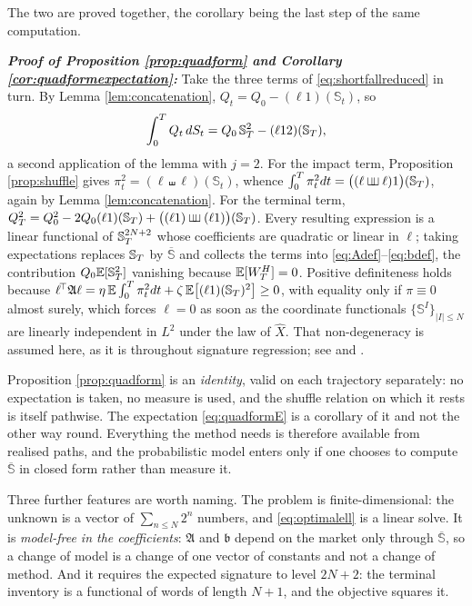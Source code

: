The two are proved together, the corollary being the last step of the same computation.

\textbf{\textit{Proof of Proposition \ref{prop:quadform} and Corollary \ref{cor:quadformexpectation}:}}
Take the three terms of \eqref{eq:shortfallreduced} in turn. By Lemma
\ref{lem:concatenation}, $Q_t=Q_0-(\ell 1)(\mathbb{S}_t)$, so
\[
  \int_0^{T}Q_t\,dS_t = Q_0\,\mathbb{S}^{2}_T-(\ell 12)(\mathbb{S}_T),
\]
a second application of the lemma with $j=2$. For the impact term, Proposition \ref{prop:shuffle}
gives $\pi_t^{2}=(\ell\shuffle\ell)(\mathbb{S}_t)$, whence
$\int_0^{T}\pi_t^{2}d t=\bigl((\ell\mathbin{\sqcup\mkern-6.5mu\sqcup}\ell)1\bigr)(\mathbb{S}_T)$, again by Lemma
\ref{lem:concatenation}. For the terminal term,
$Q_T^{2}=Q_0^{2}-2Q_0(\ell1)(\mathbb{S}_T)+\bigl((\ell1)\mathbin{\sqcup\mkern-6.5mu\sqcup}(\ell1)\bigr)(\mathbb{S}_T)$. Every
resulting expression is a linear functional of $\mathbb{S}^{2N+2}_T$ whose coefficients are quadratic or
linear in $\ell$; taking expectations replaces $\mathbb{S}_T$ by $\overline{\mathbb{S}}$ and collects the terms
into \eqref{eq:Adef}--\eqref{eq:bdef}, the contribution $Q_0\mathbb{E}[\mathbb{S}^{2}_T]$ vanishing because
$\mathbb{E}[W^{H}_T]=0$. Positive definiteness holds because
$\ell^{\!\top} \mathfrak{A}\ell=\eta\,\mathbb{E}\int_0^{T}\pi_t^{2}d t+\zeta\,\mathbb{E}\bigl[(\ell1)(\mathbb{S}_T)^{2}\bigr]\geq0$,
with equality only if $\pi\equiv0$ almost surely, which forces $\ell=0$ as soon as the coordinate
functionals $\{\mathbb{S}^{I}\}_{|I|\leq N}$ are linearly independent in $L^{2}$ under the law of
$\widehat X$. That non-degeneracy is assumed here, as it is throughout signature regression; see
\cite{levinlyonsni2013} and \cite{kalsi2020}. \qedfilledtext

\medskip

 Proposition
\ref{prop:quadform} is an \emph{identity}, valid on each trajectory separately: no expectation is
taken, no measure is used, and the shuffle relation on which it rests is itself pathwise. The
expectation \eqref{eq:quadformE} is a corollary of it and not the other way round. Everything the
method needs is therefore available from realised paths, and the probabilistic model enters only if
one chooses to compute $\overline{\mathbb{S}}$ in closed form rather than measure it.

Three further features are worth naming. The problem is finite-dimensional: the unknown is a vector
of $\sum_{n\leq N}2^{n}$ numbers, and \eqref{eq:optimalell} is a linear solve. It is
\emph{model-free in the coefficients}: $\mathfrak{A}$ and $\mathfrak{b}$ depend on the market only through
$\overline{\mathbb{S}}$, so a change of model is a change of one vector of constants and not a change
of method. And it requires the expected signature to level $2N+2$: the terminal inventory is a
functional of words of length $N+1$, and the objective squares it.

